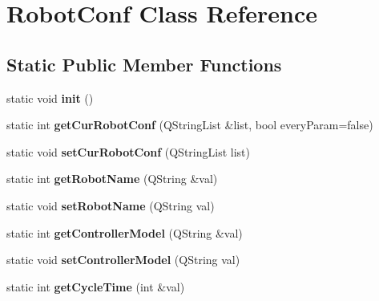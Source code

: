 \hypertarget{classRobotConf}{\section{Robot\-Conf Class Reference}
\label{classRobotConf}
}
\subsection*{Static Public Member Functions}
\begin{DoxyCompactItemize}
\item 
\hypertarget{classRobotConf_abf46ba49dcdc9807684e1a52217881ad}{static void {\bfseries init} ()}\label{classRobotConf_abf46ba49dcdc9807684e1a52217881ad}

\item 
\hypertarget{classRobotConf_aeec4ae5c8999dd2850d2b2699cf7a022}{static int {\bfseries get\-Cur\-Robot\-Conf} (Q\-String\-List \&list, bool every\-Param=false)}\label{classRobotConf_aeec4ae5c8999dd2850d2b2699cf7a022}

\item 
\hypertarget{classRobotConf_ad47f613b946e82006622d23a956466dc}{static void {\bfseries set\-Cur\-Robot\-Conf} (Q\-String\-List list)}\label{classRobotConf_ad47f613b946e82006622d23a956466dc}

\item 
\hypertarget{classRobotConf_af5f7bffce964d446b85d841300ba89df}{static int {\bfseries get\-Robot\-Name} (Q\-String \&val)}\label{classRobotConf_af5f7bffce964d446b85d841300ba89df}

\item 
\hypertarget{classRobotConf_aefed397d9f98357a09817e4eaf32eeee}{static void {\bfseries set\-Robot\-Name} (Q\-String val)}\label{classRobotConf_aefed397d9f98357a09817e4eaf32eeee}

\item 
\hypertarget{classRobotConf_a5d9b31de4e631eacd94452e0cb82e515}{static int {\bfseries get\-Controller\-Model} (Q\-String \&val)}\label{classRobotConf_a5d9b31de4e631eacd94452e0cb82e515}

\item 
\hypertarget{classRobotConf_aa5275a343f71b4aeae9a20717a9f784c}{static void {\bfseries set\-Controller\-Model} (Q\-String val)}\label{classRobotConf_aa5275a343f71b4aeae9a20717a9f784c}

\item 
\hypertarget{classRobotConf_a6aa4cc2609d4d0b271c71323db1bbcb9}{static int {\bfseries get\-Cycle\-Time} (int \&val)}\label{classRobotConf_a6aa4cc2609d4d0b271c71323db1bbcb9}


\end{DoxyCompactItemize}
